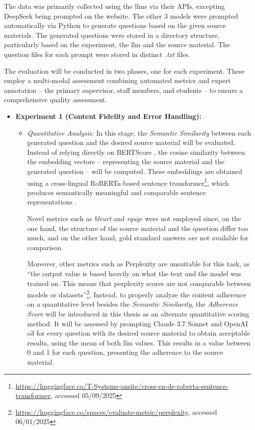  The data was primarily collected using the \ac{llms} via their APIs, excepting DeepSeek being prompted on the website. The other 3 models were prompted automatically via Python to generate questions based on the given source materials. The generated questions were stored in a directory structure, particularly based on the experiment, the \ac{llm} and the source material. The question files for each prompt were stored in distinct \textit{.txt} files.

 The evaluation will be conducted in two phases, one for each experiment. These employ a multi-modal assessment combining automated metrics and expert annotation -- the primary supervisor, staff members, and students -- to ensure a comprehensive quality assessment.

\begin{itemize}
    \item \textbf{Experiment 1 (Content Fidelity and Error Handling):}
    \begin{itemize}
        \item \textit{Quantitative Analysis:} In this stage, the \textit{Semantic Similarity} between each generated question and the desired source material will be evaluated. Instead of relying directly on BERTScore \cite{zhang_bertscore_2020}, the cosine similarity between the embedding vectors -- representing the source material and the generated question -- will be computed. These embeddings are obtained using a cross-lingual RoBERTa-based sentence transformer\footnote{\url{https://huggingface.co/T-Systems-onsite/cross-en-de-roberta-sentence-transformer}, accessed 05/09/2025}, which produces semantically meaningful and comparable sentence representations \cite{reimers_sentence-bert_2019}.
        
        Novel metrics such as \textit{\ac{bleurt}} and \textit{\ac{rquge}} were not employed since, on the one hand, the structure of the source material and the question differ too much, and on the other hand, gold standard answers are not available for comparison.

        Moreover, other metrics such as Perplexity are unsuitable for this task, as \enquote{the output value is based heavily on what the text and the model was trained on. This means that perplexity scores are not comparable between models or datasets}\footnote{\url{https://huggingface.co/spaces/evaluate-metric/perplexity}, accessed 06/01/2025}. Instead, to properly analyze the content adherence on a quantitative level besides the \textit{Semantic Similarity}, the \textit{Adherence Score} will be introduced in this thesis as an alternate quantitative scoring method. It will be assessed by prompting Claude 3.7 Sonnet and OpenAI o3 for every question with its desired source material to obtain acceptable results, using the mean of both \ac{llm} values. This results in a value between 0 and 1 for each question, presenting the adherence to the source material.


\end{itemize}
\end{itemize}
